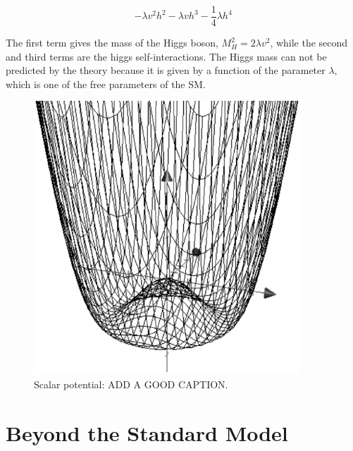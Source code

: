     \begin{equation}
      -\lambda v^2h^2 - \lambda v h^3 - \frac{1}{4}\lambda h^4
    \end{equation}

    The first term gives the mass of the Higgs boson, $M^2_H = 2\lambda v^2$, while the second and third terms are the higgs self-interactions.
    The Higgs mass can not be predicted by the theory because it is given by a function of the parameter $\lambda$, which is one of the free parameters of the \acrshort{SM}.
    
    \begin{figure}[h]
    \centering
      \includegraphics[width = 10cm]{Pictures/SM/mexHat.eps}
    \caption{Scalar potential: ADD A GOOD CAPTION.}
    \label{fig:scalarPotential}
    \end{figure}


  \section{Beyond the Standard Model}



